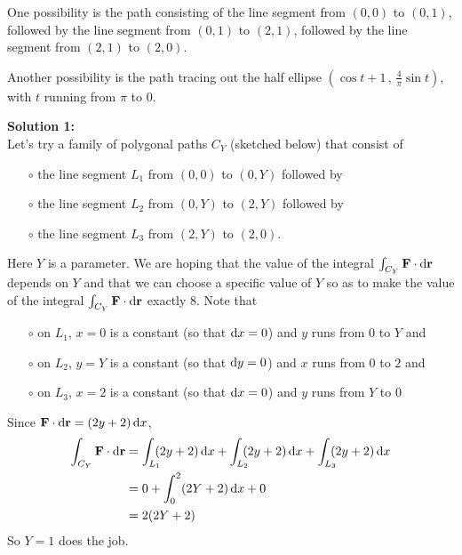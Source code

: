 \begin{answer} 
	One possibility is the path consisting of the line
	segment from $(0,0)$ to $(0,1)$, followed by the line segment from
	$(0,1)$ to $(2,1)$, followed by the line segment from $(2,1)$ to $(2,0)$.
	
	Another possibility is the path tracing out the half ellipse $\left(\cos t+1\, , \, \frac{4}{\pi}\sin t\right)$, 
	with $t$ running from $\pi$ to $0$.
\end{answer}

\begin{solution} 
	\textbf{Solution 1:}\\
	Let's try a family of polygonal paths $C_Y$ (sketched below) that consist of
	\begin{itemize}\itemsep1pt \parskip0pt  %
		\item[$\circ$]
		the line segment $L_1$ from $(0,0)$ to $(0,Y)$ followed by
		\item[$\circ$]
		the line segment $L_2$ from $(0,Y)$ to $(2,Y)$ followed by
		\item[$\circ$]
		the line segment $L_3$ from $(2,Y)$ to $(2,0)$.
	\end{itemize}
	Here $Y$ is a parameter. 
	We are hoping that the value of the integral
	$\int_{C_Y} \mathbf{F}\cdot\mathrm{d}\mathbf{r}$ depends on $Y$ and that we can choose 
	a specific value of $Y$ so as to make the value of the integral 
	$\int_{C_Y} \mathbf{F}\cdot\mathrm{d}\mathbf{r}$ exactly $8$. Note that
	\begin{itemize}\itemsep1pt \parskip0pt  %
		\item[$\circ$]
		on $L_1$, $x=0$ is a constant (so that $\mathrm{d}x=0$)
		and $y$ runs from $0$ to $Y$ and 
		\item[$\circ$]
		on $L_2$, $y=Y$ is a constant (so that $\mathrm{d}y=0$)
		and $x$ runs from $0$ to $2$ and 
		\item[$\circ$]
		on $L_3$, $x=2$ is a constant (so that $\mathrm{d}x=0$)
		and $y$ runs from $Y$ to $0$
	\end{itemize}
	Since $\mathbf{F}\cdot\mathrm{d}\mathbf{r} = (2y+2)\,\mathrm{d}x$,
	\begin{align*}
	\int_{C_Y} \mathbf{F}\cdot\mathrm{d}\mathbf{r}
	&= \int_{L_1}\hskip-5pt (2y+2)\,\mathrm{d}x
	+ \int_{L_2}\hskip-5pt (2y+2)\,\mathrm{d}x
	+ \int_{L_3}\hskip-5pt (2y+2)\,\mathrm{d}x \\
	&= 0
	+ \int_0^2 (2Y+2)\,\mathrm{d}x
	+ 0 \\  
	&= 2(2Y+2) 
	\end{align*}
	So $Y=1$ does the job.
	

\end{solution}
